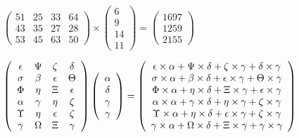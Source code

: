\documentclass[12pt]{article}
\begin{document}
\noindent{}
 
 

 
$\left( \begin{array}{ccccccccccccccc}
 51  & 
 25  & 
 33  & 
 64  \\ 
 43  & 
 35  & 
 27  & 
 28  \\ 
 53  & 
 45  & 
 63  & 
 50
\end{array}\right) \times
\left( \begin{array}{c}
 6  \\ 
 9  \\ 
 14  \\ 
 11
\end{array}\right)  =
\left( \begin{array}{c}
 1697  \\ 
 1259  \\ 
 2155
\end{array}\right)  $
 
$  %
 \left( \begin{array}
 {
 c
 c
 c
 c
 }
 \epsilon & 
 \Psi & 
                    \zeta & 
 \delta \\ 
 \sigma & 
 \beta & 
 \epsilon & 
 \Theta \\ 
 \Phi & 
 \eta & 
                    \Xi & 
 \epsilon \\ 
 \alpha & 
 \gamma & 
 \eta & 
                    \zeta \\ 
 \Upsilon & 
 \eta & 
 \epsilon & 
                    \zeta \\ 
 \gamma & 
 \Omega & 
                    \Xi & 
 \gamma
 \end{array} \right)
 \left( \begin{array}
 {
 c
 }
 \alpha \\ 
 \delta \\ 
 \gamma \\ 
 \gamma
 \end{array} \right)
=
  \left( \begin{array}
 {
 c
 }
 \epsilon \times  \alpha   +  \Psi \times  \delta   +                     \zeta \times  \gamma   +  \delta \times  \gamma \\ 
 \sigma \times  \alpha   +  \beta \times  \delta   +  \epsilon \times  \gamma   +  \Theta \times  \gamma \\ 
 \Phi \times  \alpha   +  \eta \times  \delta   +                     \Xi \times  \gamma   +  \epsilon \times  \gamma \\ 
 \alpha \times  \alpha   +  \gamma \times  \delta   +  \eta \times  \gamma   +                     \zeta \times  \gamma \\ 
 \Upsilon \times  \alpha   +  \eta \times  \delta   +  \epsilon \times  \gamma   +                     \zeta \times  \gamma \\ 
 \gamma \times  \alpha   +  \Omega \times  \delta   +                     \Xi \times  \gamma   +  \gamma \times  \gamma
 \end{array} \right)
$
 
\end{document}
